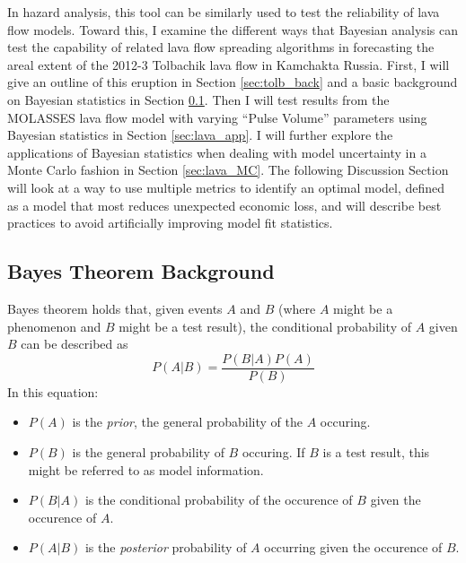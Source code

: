 \documentclass[12pt,letter]{article}
\begin{document}
	In hazard analysis, this tool can be similarly used to test the reliability of lava flow models. Toward this, I examine the different ways that Bayesian analysis can test the capability of related lava flow spreading algorithms in forecasting the areal extent of the 2012-3 Tolbachik lava flow in Kamchakta Russia. First, I will give an outline of this eruption in Section \ref{sec:tolb_back} and a basic background on Bayesian statistics in Section \ref{sec:bayes_back}. Then I will test results from the MOLASSES lava flow model with varying ``Pulse Volume'' parameters using Bayesian statistics in Section \ref{sec:lava_app}. I will further explore the applications of Bayesian statistics when dealing with model uncertainty in a Monte Carlo fashion in Section \ref{sec:lava_MC}. The following Discussion Section will look at a way to use multiple metrics to identify an optimal model, defined as a model that most reduces unexpected economic loss, and will describe best practices to avoid artificially improving model fit statistics.

	\subsection{Bayes Theorem Background}\label{sec:bayes_back}
		Bayes theorem holds that, given events $A$ and $B$ (where $A$ might be a phenomenon and $B$ might be a test result), the conditional probability of $A$ given $B$ can be described as
		\begin{equation}
		P(A|B)=\frac{P(B|A)P(A)}{P(B)}\label{eq_bayes}
		\end{equation}
		In this equation:
		\begin{itemize}
			\item $P(A)$ is the \textit{prior}, the general probability of the $A$ occuring.
			\item $P(B)$ is the general probability of $B$ occuring. If $B$ is a test result, this might be referred to as model information.
			\item $P(B|A)$ is the conditional probability of the occurence of $B$ given the occurence of $A$.
			\item $P(A|B)$ is the \textit{posterior} probability of $A$ occurring given the occurence of $B$.
		\end{itemize}
\end{document}
